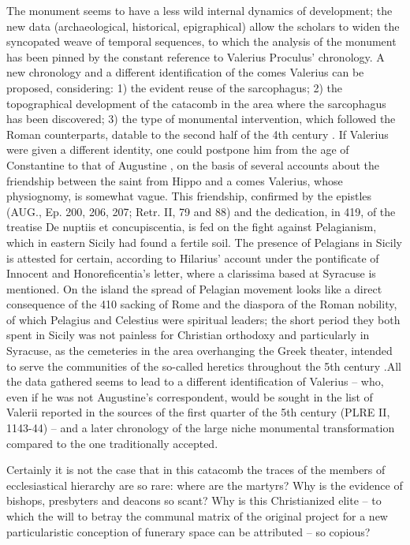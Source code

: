 \documentclass[amsthm,ebook]{saparticle}
\begin{document}
The monument seems to have a less wild internal dynamics of development; the new data (archaeological, historical, epigraphical) \citep[101-108]{SGARLATA1996} allow the scholars to widen the syncopated weave of temporal sequences, to which the analysis of the monument has been pinned by the constant reference to Valerius Proculus’ chronology. A new chronology and a different identification of the comes Valerius can be proposed, considering: 1) the evident reuse of the sarcophagus; 2) the topographical development of the catacomb in the area where the sarcophagus has been discovered; 3) the type of monumental intervention, which followed the Roman counterparts, datable to the second half of the 4th century \citep[132-134]{FIOCCHINICOLAI 1997}. If Valerius were given a different identity, one could postpone him from the age of Constantine to that of Augustine \citep[15-51]{SGARLATA1998}, on the basis of several accounts about the friendship between the saint from Hippo and a comes Valerius, whose physiognomy, is somewhat vague. This friendship, confirmed by the epistles (AUG., Ep. 200, 206, 207; Retr. II, 79 and 88) and the dedication, in 419, of the treatise De nuptiis et concupiscentia, is fed on the fight against Pelagianism, which in eastern Sicily had found a fertile soil. The presence of Pelagians in Sicily is attested for certain, according to Hilarius’ account under the pontificate of Innocent \citep[429-452]{PIETRI2000} and Honoreficentia’s letter, where a clarissima based at Syracuse is mentioned. On the island the spread of Pelagian movement looks like a direct consequence of the 410 sacking of Rome and the diaspora of the Roman nobility, of which Pelagius and Celestius were spiritual leaders; the short period they both spent in Sicily was not painless for Christian orthodoxy %
 and particularly in Syracuse, as the cemeteries in the area overhanging the Greek theater, intended to serve the communities of the so-called heretics throughout the 5th century \citep{AGNELLO1990}.All the data gathered seems to lead to a different identification of Valerius – who, even if he was not Augustine’s correspondent, would be sought in the list of Valerii reported in the sources of the first quarter of the 5th century (PLRE II, 1143-44) – and a later chronology of the large niche monumental transformation compared to the one traditionally accepted.

Certainly it is not the case that in this catacomb the traces of the members of ecclesiastical hierarchy are so rare: where are the martyrs? Why is the evidence of bishops, presbyters and deacons so scant? Why is this Christianized elite – to which the will to betray the communal matrix of the original project for a new particularistic conception of funerary space can be attributed – so copious?
\end{document}
